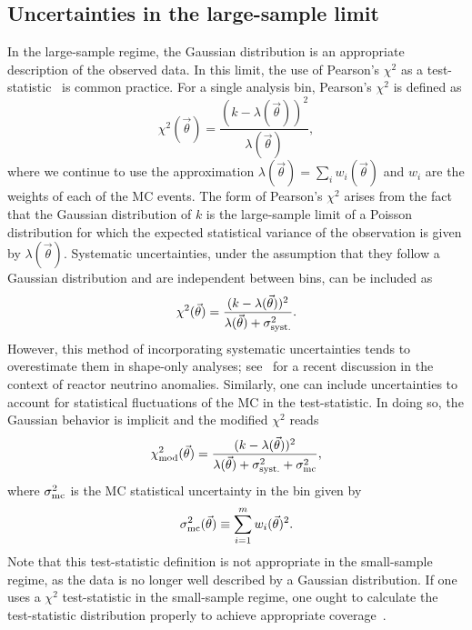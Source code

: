 \documentclass[a4paper, 11pt]{article}
\newcommand{\vectheta}{\vec{\theta}}
\begin{document}
\subsection{Uncertainties in the large-sample limit}
In the large-sample regime, the Gaussian distribution is an appropriate description of the observed data. In this limit, the use of Pearson's $\chi^2$ as a test-statistic~\cite{Pearson:1900} is common practice. For a single analysis bin, Pearson's $\chi^2$ is defined as
\begin{equation}
\chi^2(\vectheta) = \frac{(k - \lambda(\vectheta))^2}{\lambda(\vectheta)},
\label{eq:chi2_pearson}
\end{equation}
where we continue to use the approximation $\lambda(\vectheta) = \sum_i{w_i(\vectheta)}$ and $w_i$ are the weights of each of the MC events. The form of Pearson's $\chi^2$ arises from the fact that the Gaussian distribution of $k$ is the large-sample limit of a Poisson distribution for which the expected statistical variance of the observation is given by $\lambda(\vectheta)$. Systematic uncertainties, under the assumption that they follow a Gaussian distribution and are independent between bins, can be included as
\begin{equation}
\chi^2(\vectheta) = \frac{(k - \lambda(\vectheta))^2}{\lambda(\vectheta) + \sigma^2_{\rm syst.}}.
\label{eq:chi2_systematics}
\end{equation}
However, this method of incorporating systematic uncertainties tends to overestimate them in shape-only analyses; see~\cite{Cogswell:2018auu} for a recent discussion in the context of reactor neutrino anomalies. Similarly, one can include uncertainties to account for statistical fluctuations of the MC in the test-statistic. In doing so, the Gaussian behavior is implicit and the modified $\chi^2$ reads
\begin{align}
\chi^2_{\rm mod}(\vectheta) = \frac{(k - \lambda(\vectheta))^2}{\lambda(\vectheta) + \sigma^2_{\rm syst.} + \sigma^2_{\rm mc}},
\label{eq:modified_chi2}
\end{align}
where $\sigma^2_{\rm mc}$ is the MC statistical uncertainty in the bin given by
\begin{equation}\label{eq:sigma}
\sigma^2_{\rm mc}(\vectheta) \equiv \sum_{i=1}^m w_i(\vectheta)^2.
\end{equation}
Note that this test-statistic definition is not appropriate in the small-sample regime, as the data is no longer well described by a Gaussian distribution. If one uses a $\chi^2$ test-statistic in the small-sample regime, one ought to calculate the test-statistic distribution properly to achieve appropriate coverage~\cite{cowan1998statistical}.
\end{document}

